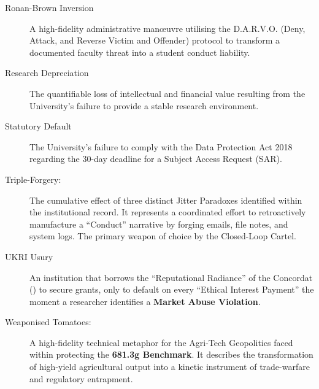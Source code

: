 \documentclass{EMBASSY}
\begin{document}
\begin{description}
	\item[Ronan-Brown Inversion] A high-fidelity administrative man\oe uvre utilising the D.A.R.V.O. (Deny, Attack, and Reverse Victim and Offender) protocol to transform a documented faculty threat into a student conduct liability.
	\item[Research Depreciation] The quantifiable loss of intellectual and financial value resulting from the University’s failure to provide a stable research environment.
	\item[Statutory Default] The University’s failure to comply with the Data Protection Act 2018 regarding the 30-day deadline for a Subject Access Request (SAR).
	\item[Triple-Forgery:] The cumulative effect of three distinct Jitter Paradoxes identified within the institutional record. It represents a coordinated effort to retroactively manufacture a ``Conduct'' narrative by forging emails, file notes, and system logs. The primary weapon of choice by the Closed-Loop Cartel.
	\item[UKRI Usury] An institution that borrows the ``Reputational Radiance'' of the Concordat (\cite{Concordat25}) to secure grants, only to default on every ``Ethical Interest Payment'' the moment a researcher identifies a \textbf{Market Abuse Violation}.
	\item[Weaponised Tomatoes:] A high-fidelity technical metaphor for the Agri-Tech Geopolitics faced within protecting the \textbf{681.3g Benchmark}. It describes the transformation of high-yield agricultural output into a kinetic instrument of trade-warfare and regulatory entrapment.
\end{description}

\clearpage
\renewcommand{\bibname}{SCHEDULE A: FORENSIC REFERENCE LEDGER}

\nocite{*}

\end{document}
